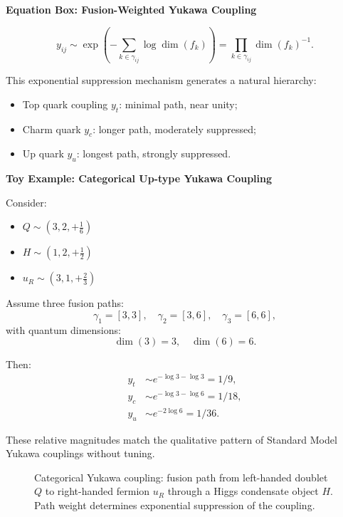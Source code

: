 \documentclass[11pt]{article}
\def\frac#1#2{#1/#2}
\def\left{}
\def\right{}
\begin{document}
\vspace{0.5em}
\noindent\textbf{Equation Box: Fusion-Weighted Yukawa Coupling}

\begin{equation}
y_{ij} \sim \exp\left( -\sum_{k \in \gamma_{ij}} \log \dim(f_k) \right) = \prod_{k \in \gamma_{ij}} \dim(f_k)^{-1}.
\label{eq:yukawa}
\end{equation}

This exponential suppression mechanism generates a natural hierarchy:
\begin{itemize}
  \item Top quark coupling \( y_t \): minimal path, near unity;
  \item Charm quark \( y_c \): longer path, moderately suppressed;
  \item Up quark \( y_u \): longest path, strongly suppressed.
\end{itemize}

\vspace{0.5em}
\noindent\textbf{Toy Example: Categorical Up-type Yukawa Coupling}

Consider:
\begin{itemize}
  \item \( Q \sim (3,2,+\tfrac{1}{6}) \)
  \item \( H \sim (1,2,+\tfrac{1}{2}) \)
  \item \( u_R \sim (3,1,+\tfrac{2}{3}) \)
\end{itemize}

Assume three fusion paths:
\[
\gamma_1 = [3,3], \quad \gamma_2 = [3,6], \quad \gamma_3 = [6,6],
\]
with quantum dimensions:
\[
\dim(3) = 3, \quad \dim(6) = 6.
\]

Then:
\[
\begin{aligned}
y_t &\sim e^{-\log 3 - \log 3} = \frac{1}{9}, \\
y_c &\sim e^{-\log 3 - \log 6} = \frac{1}{18}, \\
y_u &\sim e^{-2 \log 6} = \frac{1}{36}.
\end{aligned}
\]

These relative magnitudes match the qualitative pattern of Standard Model Yukawa couplings without tuning.

\begin{figure}[H]
\centering
{}
\caption{Categorical Yukawa coupling: fusion path from left-handed doublet \( Q \) to right-handed fermion \( u_R \) through a Higgs condensate object \( H \). Path weight determines exponential suppression of the coupling.}
\label{fig:yukawa-fusion}
\end{figure}
\end{document}
